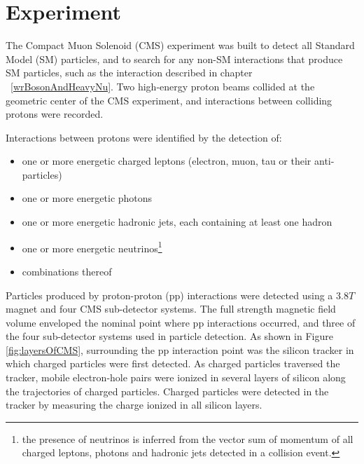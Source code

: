 \chapter{Experiment}
\label{experiment_chapter}
The Compact Muon Solenoid (CMS) experiment was built to detect all Standard Model (SM) particles, and to
search for any non-SM interactions that produce SM particles, such as the interaction described in 
chapter ~\ref{wrBosonAndHeavyNu}.  Two high-energy proton beams collided at the geometric center of
the CMS experiment, and interactions between colliding protons were recorded.

Interactions between protons were identified by the detection of:
\begin{itemize}
	\item one or more energetic charged leptons (electron, muon, tau or their anti-particles)
	\item one or more energetic photons
	\item one or more energetic hadronic jets, each containing at least one hadron
	\item one or more energetic neutrinos\footnote{the presence of neutrinos is inferred from the vector sum of momentum of all charged leptons, photons and hadronic jets detected in a collision event.}
	\item combinations thereof
\end{itemize}
Particles produced by proton-proton (pp) interactions were detected using a 3.8$\unit{T}$ magnet and four CMS 
sub-detector systems.  The full strength magnetic field volume enveloped the nominal point where pp interactions occurred, and three of the four 
sub-detector systems used in particle detection.  As shown in Figure \ref{fig:layersOfCMS}, surrounding the pp interaction
point was the silicon tracker in which charged particles were first detected.  As charged particles traversed
the tracker, mobile electron-hole pairs were ionized in several layers of silicon along the trajectories of charged
particles.  Charged particles were detected in the tracker by measuring the charge ionized in all silicon layers.

